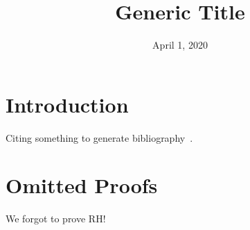 \documentclass[12pt]{default}
\title{Generic Title}
\date{April 1, 2020}
\begin{document}
\maketitle

\begin{abstract}
\end{abstract}

\clearpage
{}

\section{Introduction}
Citing something to generate bibliography~\autocite{MolinaLovettS19:optim_regul_expres_permut}.

% 


\clearpage
\printbibliography

\clearpage
\appendix

\section{Omitted Proofs}
% 
We forgot to prove RH!

\end{document}
